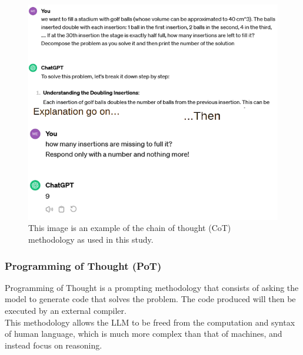 \documentclass[12pt]{article}
\begin{document}
\begin{figure}[H]
    \centering
            \includegraphics[width=1\textwidth]{MyCoT.png}
    \caption[Example of Chain of Thought methodology as used]{This image is an example of the chain of thought (CoT) methodology as used in this study.}
    \end{figure} 
 
    \subsubsection{Programming of Thought (PoT)}
    Programming of Thought is a prompting methodology that consists of asking the model to generate code that solves the problem. The code produced will then be executed by an external compiler. \\
This methodology allows the LLM to be freed from the computation and syntax of human language, which is much more complex than that of machines, and instead focus on reasoning.  \\
  
\end{document}
